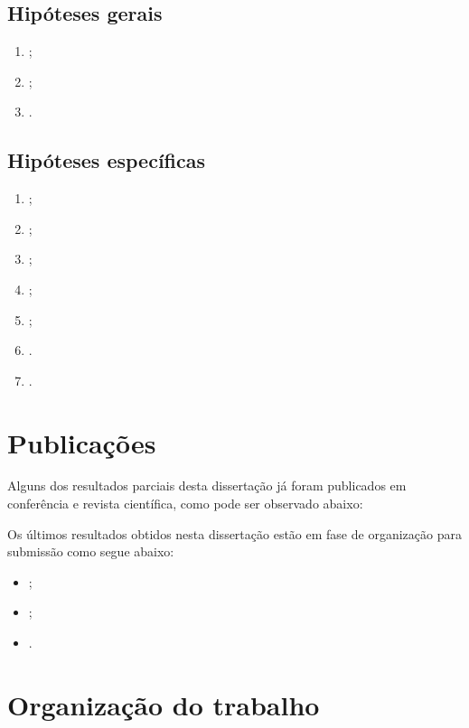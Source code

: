 \subsection{Hipóteses gerais}
\label{sec-hipoteses-gerais}
\begin{enumerate}
\item{\label{hg1ref} \hgatexto;}
\item{\label{hg2ref} \hgbtexto;}
\item{\label{hg3ref} \hgctexto.}
\end{enumerate}

\subsection{Hipóteses específicas}
\label{sec-hipoteses-especificas}
\begin{enumerate}
\item{\label{he1ref} \heatexto;}
\item{\label{he2ref} \hebtexto;}
\item{\label{he3ref} \hectexto;}
\item{\label{he4ref} \hedtexto;}
\item{\label{he5ref} \heetexto;}
\item{\label{he6ref} \heftexto.}
\item{\label{he7ref} \hegtexto.}
\end{enumerate}

\section{Publicações}
\label{sec-publicacoes}
Alguns dos resultados parciais desta dissertação já
foram publicados em conferência e revista científica,
como pode ser observado abaixo:
\begin{itemize}

\end{itemize}
Os últimos resultados obtidos nesta dissertação estão
em fase de organização para submissão como segue abaixo:

\begin{itemize}
\item{;}
\item{;}
\item{.}
\end{itemize}

\section{Organização do trabalho}
